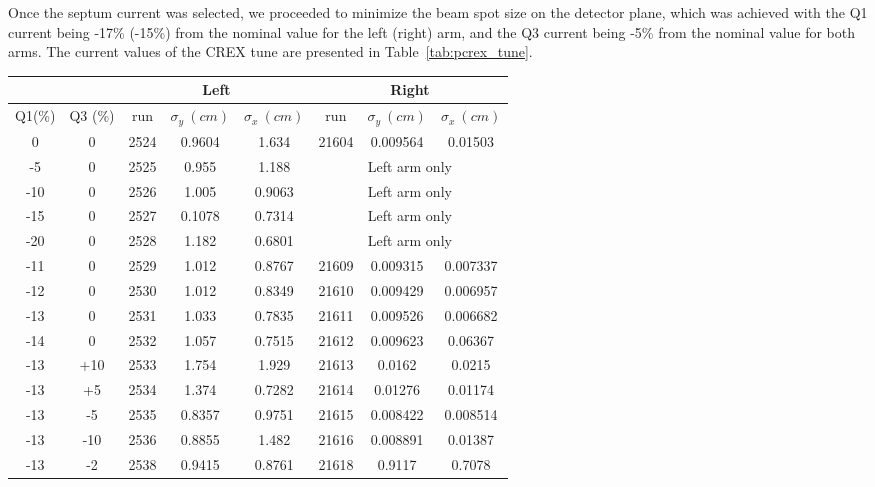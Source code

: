 Once the septum current was selected, we proceeded to minimize the beam spot size 
on the detector plane, which was achieved with the Q1 current being -17\% (-15\%) 
from the nominal value for the left (right) arm, and the Q3 current being -5\% from
the nominal value for both arms. The current values of the CREX tune are presented 
in Table~\ref{tab:pcrex_tune}.
\begin{table}[h!]
    \begin{tabular}{c c | c c c | c c c}
	\hline
	& & \multicolumn{3}{c}{Left} & \multicolumn{3}{c}{Right}  \\
	\hline
	Q1(\%)  & Q3 (\%)    & run   & $\sigma_y\ (cm)$  & $\sigma_x\ (cm)$   & run   & $\sigma_y\ (cm)$    & $\sigma_x\ (cm)$    \\
	\hline
	0   & 0	    & 2524  & 0.9604	& 1.634	    & 21604	& 0.009564  & 0.01503 \\
	-5  & 0	    & 2525  & 0.955	& 1.188	    & \multicolumn{3}{c}{Left arm only}    \\
	-10 & 0	    & 2526  & 1.005	& 0.9063    & \multicolumn{3}{c}{Left arm only}    \\ 
	-15 & 0	    & 2527  & 0.1078	& 0.7314    & \multicolumn{3}{c}{Left arm only}    \\ 
	-20 & 0	    & 2528  & 1.182	& 0.6801    & \multicolumn{3}{c}{Left arm only}    \\ 
	\hline                              
	-11 & 0	    & 2529  & 1.012	& 0.8767    & 21609	& 0.009315  & 0.007337	\\
	-12 & 0	    & 2530  & 1.012	& 0.8349    & 21610	& 0.009429  & 0.006957  \\
	-13 & 0	    & 2531  & 1.033	& 0.7835    & 21611	& 0.009526  & 0.006682  \\
	-14 & 0	    & 2532  & 1.057	& 0.7515    & 21612	& 0.009623  & 0.06367   \\
	\hline                              
	-13 & +10   & 2533  & 1.754	& 1.929	    & 21613	& 0.0162    & 0.0215    \\
	-13 & +5    & 2534  & 1.374	& 0.7282    & 21614	& 0.01276   & 0.01174   \\
	-13 & -5    & 2535  & 0.8357	& 0.9751    & 21615	& 0.008422  & 0.008514  \\
	-13 & -10   & 2536  & 0.8855	& 1.482	    & 21616	& 0.008891  & 0.01387   \\
	\hline
	-13 & -2    & 2538  & 0.9415	& 0.8761    & 21618	& 0.9117    & 0.7078  \\

\end{tabular}
\end{table}

